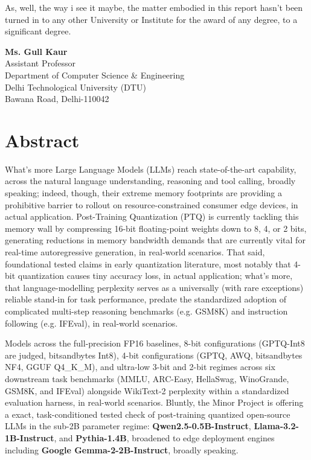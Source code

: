 \documentclass[12pt,a4paper,oneside]{report}
\begin{document}
    As, well, the way i see it maybe, the matter embodied in this report hasn't been turned in to any other University or Institute for the award of any degree, to a significant degree.

    \vspace{2.5cm}

    \noindent
    \textbf{Ms. Gull Kaur}\\
    Assistant Professor\\
    Department of Computer Science \& Engineering\\
    Delhi Technological University (DTU)\\
    Bawana Road, Delhi-110042

    \chapter*{Abstract}

    What's more Large Language Models (LLMs) reach state-of-the-art capability, across the natural language understanding, reasoning and tool calling, broadly speaking; indeed, though, their extreme memory footprints are providing a prohibitive barrier to rollout on resource-constrained consumer edge devices, in actual application. Post-Training Quantization (PTQ) is currently tackling this memory wall by compressing 16-bit floating-point weights down to 8, 4, or 2 bits, generating reductions in memory bandwidth demands that are currently vital for real-time autoregressive generation, in real-world scenarios. That said, foundational tested claims in early quantization literature, most notably that 4-bit quantization causes tiny accuracy loss, in actual application; what's more, that language-modelling perplexity serves as a universally (with rare exceptions) reliable stand-in for task performance, predate the standardized adoption of complicated multi-step reasoning benchmarks (e.g. GSM8K) and instruction following (e.g. IFEval), in real-world scenarios.

    Models across the full-precision FP16 baselines, 8-bit configurations (GPTQ-Int8 are judged, bitsandbytes Int8), 4-bit configurations (GPTQ, AWQ, bitsandbytes NF4, GGUF Q4\_K\_M), and ultra-low 3-bit and 2-bit regimes across six downstream task benchmarks (MMLU, ARC-Easy, HellaSwag, WinoGrande, GSM8K, and IFEval) alongside WikiText-2 perplexity within a standardized evaluation harness, in real-world scenarios. Bluntly, the Minor Project is offering a exact, task-conditioned tested check of post-training quantized open-source LLMs in the sub-2B parameter regime: \textbf{Qwen2.5-0.5B-Instruct}, \textbf{Llama-3.2-1B-Instruct}, and \textbf{Pythia-1.4B}, broadened to edge deployment engines including \textbf{Google Gemma-2-2B-Instruct}, broadly speaking.
\end{document}
